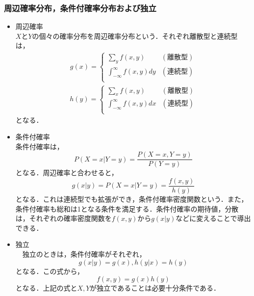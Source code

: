 \documentclass[autodetect-engine,dvipdfmx-if-dvi,ja=standard,a4paper,11pt]{bxjsarticle} %
\begin{document}
\subsubsection{周辺確率分布，条件付確率分布および独立}
\setlength{\leftmargini}{0pt}
\begin{itemize}
\item 周辺確率\\
 $X$と$Y$の個々の確率分布を周辺確率分布という．それぞれ離散型と連続型は，
 \begin{eqnarray}
 g(x)=\left\{ \begin{array}{ll}
 \displaystyle\sum_{y}f(x,y) &  (\mbox{離散型}) \\
 \displaystyle\int_{-\infty}^{\infty}f(x,y)dy & (\mbox{連続型}) \\
 \end{array} \right.
 \end{eqnarray}
 \begin{eqnarray}
h(y)=\left\{ \begin{array}{ll}
\displaystyle\sum_{x}f(x,y) &  (\mbox{離散型}) \\
\displaystyle\int_{-\infty}^{\infty}f(x,y)dx & (\mbox{連続型}) \\
\end{array} \right.
\end{eqnarray}
となる．
 
\item 条件付確率\\
 条件付確率は，
\begin{equation}
P(X=x|Y=y)=\frac{P(X=x,Y=y)}{P(Y=y)}
\end{equation}
となる．周辺確率と合わせると，
\begin{equation}
g(x|y)=P(X=x|Y=y)=\frac{f(x,y)}{h(y)}
\end{equation}
となる．これは連続型でも拡張ができ，条件付確率密度関数という．また，条件付確率も総和は1となる条件を満足する．条件付確率の期待値，分散は，それぞれの確率密度関数を$f(x,y)$から$g(x|y)$などに変えることで導出できる．

\item 独立\\
　独立のときは，条件付確率がそれぞれ，
\begin{equation}
g(x|y)=g(x),h(y|x)=h(y)
\end{equation}
となる．この式から，
\begin{equation}
f(x,y)=g(x)h(y)
\end{equation}
となる．上記の式と$X,Y$が独立であることは必要十分条件である．


\end{itemize}
\end{document}
